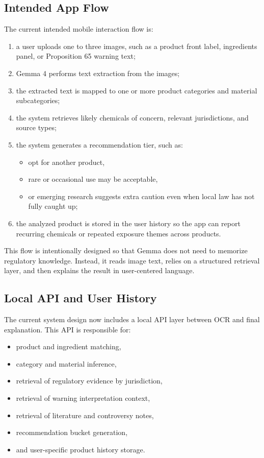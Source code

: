 \documentclass[11pt]{article}
\begin{document}
\subsection{Intended App Flow}

The current intended mobile interaction flow is:

\begin{enumerate}[leftmargin=1.5em]
\item a user uploads one to three images, such as a product front label, ingredients panel, or Proposition 65 warning text;
\item Gemma 4 performs text extraction from the images;
\item the extracted text is mapped to one or more product categories and material subcategories;
\item the system retrieves likely chemicals of concern, relevant jurisdictions, and source types;
\item the system generates a recommendation tier, such as:
    \begin{itemize}[leftmargin=1.5em]
    \item opt for another product,
    \item rare or occasional use may be acceptable,
    \item or emerging research suggests extra caution even when local law has not fully caught up;
    \end{itemize}
\item the analyzed product is stored in the user history so the app can report recurring chemicals or repeated exposure themes across products.
\end{enumerate}

This flow is intentionally designed so that Gemma does not need to memorize regulatory knowledge. Instead, it reads image text, relies on a structured retrieval layer, and then explains the result in user-centered language.

\subsection{Local API and User History}

The current system design now includes a local API layer between OCR and final explanation. This API is responsible for:

\begin{itemize}[leftmargin=1.5em]
\item product and ingredient matching,
\item category and material inference,
\item retrieval of regulatory evidence by jurisdiction,
\item retrieval of warning interpretation context,
\item retrieval of literature and controversy notes,
\item recommendation bucket generation,
\item and user-specific product history storage.
\end{itemize}
\end{document}
